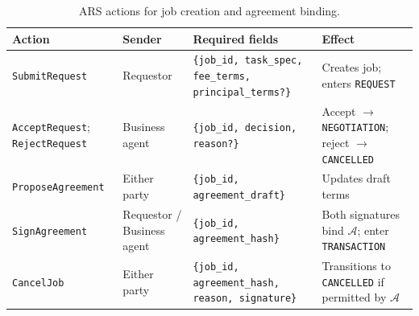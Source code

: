\begin{table}[!ht]
\centering
\small
\setlength{\tabcolsep}{6pt}
\renewcommand{\arraystretch}{1.25}
\begin{tabular}{p{3.3cm}p{2.2cm}p{4.4cm}p{3.5cm}}
\hline
\textbf{Action} & \textbf{Sender} & \textbf{Required fields} & \textbf{Effect} \\
\hline
\texttt{SubmitRequest} & Requestor &
\texttt{\{job\_id, task\_spec, fee\_terms, principal\_terms?\}} &
Creates job; enters \texttt{REQUEST} \\
\texttt{AcceptRequest}; \texttt{RejectRequest} & Business agent &
\texttt{\{job\_id, decision, reason?\}} &
Accept $\rightarrow$ \texttt{NEGOTIATION}; reject $\rightarrow$ \texttt{CANCELLED} \\
\texttt{ProposeAgreement} & Either party &
\texttt{\{job\_id, agreement\_draft\}} &
Updates draft terms \\
\texttt{SignAgreement} & Requestor / Business agent &
\texttt{\{job\_id, agreement\_hash\}} &
Both signatures bind $\mathcal{A}$; enter \texttt{TRANSACTION} \\
\texttt{CancelJob} & Either party &
\texttt{\{job\_id, agreement\_hash, reason, signature\}} &
Transitions to \texttt{CANCELLED} if permitted by $\mathcal{A}$ \\
\hline
\end{tabular}
\caption{\textsc{ARS} actions for job creation and agreement binding.}
\label{tab:arp-actions-setup}
\end{table}